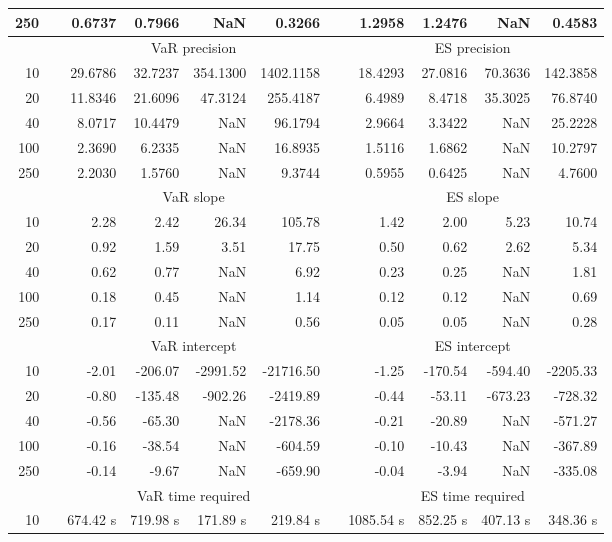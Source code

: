 {{\begin{longtable}{rr rrrr r rrrr}
250 && 0.6737  & 0.7966  &    NaN & 0.3266 && 1.2958  & 1.2476  &    NaN & 0.4583 \\ 
\hline 
 & & \multicolumn{4}{c}{VaR precision} &&  \multicolumn{4}{c}{ES precision} \\ \cline{3-6}  \cline{8-11}
10 && 29.6786 & 32.7237 & 354.1300 & 1402.1158 & & 18.4293 & 27.0816 & 70.3636 & 142.3858 \\ 
20 && 11.8346 & 21.6096 & 47.3124 & 255.4187 & & 6.4989 & 8.4718 & 35.3025 & 76.8740 \\ 
40 && 8.0717 & 10.4479 &    NaN & 96.1794 & & 2.9664 & 3.3422 &    NaN & 25.2228 \\ 
100 && 2.3690 & 6.2335 &    NaN & 16.8935 & & 1.5116 & 1.6862 &    NaN & 10.2797 \\ 
250 && 2.2030 & 1.5760 &    NaN & 9.3744 & & 0.5955 & 0.6425 &    NaN & 4.7600 \\ 
\hline 
 & & \multicolumn{4}{c}{ VaR slope} && \multicolumn{4}{c}{ES slope} \\ \cline{3-6}  \cline{8-11}
10 && 2.28 & 2.42 & 26.34 & 105.78 && 1.42 & 2.00 & 5.23 & 10.74 \\ 
20 && 0.92 & 1.59 & 3.51 & 17.75 && 0.50 & 0.62 & 2.62 & 5.34 \\ 
40 && 0.62 & 0.77 &  NaN & 6.92 && 0.23 & 0.25 &  NaN & 1.81 \\ 
100 && 0.18 & 0.45 &  NaN & 1.14 && 0.12 & 0.12 &  NaN & 0.69 \\ 
250 && 0.17 & 0.11 &  NaN & 0.56 && 0.05 & 0.05 &  NaN & 0.28 \\ 
\hline 
 & & \multicolumn{4}{c}{ VaR intercept} &&  \multicolumn{4}{c}{ES intercept} \\ \cline{3-6}  \cline{8-11}
10 && -2.01 & -206.07 & -2991.52 & -21716.50 && -1.25 & -170.54 & -594.40 & -2205.33 \\ 
20 && -0.80 & -135.48 & -902.26 & -2419.89 && -0.44 & -53.11 & -673.23 & -728.32 \\ 
40 && -0.56 & -65.30 &  NaN & -2178.36 && -0.21 & -20.89 &  NaN & -571.27 \\ 
100 && -0.16 & -38.54 &  NaN & -604.59 && -0.10 & -10.43 &  NaN & -367.89 \\ 
250 && -0.14 & -9.67 &  NaN & -659.90 && -0.04 & -3.94 &  NaN & -335.08 \\ 
\hline 
 & & \multicolumn{4}{c}{VaR time required} && \multicolumn{4}{c}{ES time required} \\ \cline{3-6}  \cline{8-11}
10 & & 674.42 s & 719.98 s & 171.89 s & 219.84 s && 1085.54 s & 852.25 s & 407.13 s & 348.36 s \\ 

\end{longtable}}}
